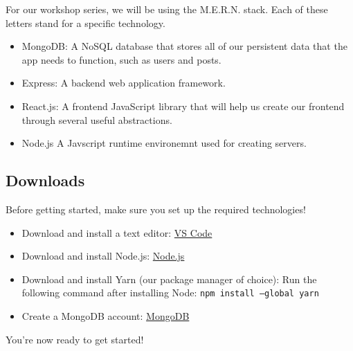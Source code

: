 For our workshop series, we will be using the M.E.R.N. stack. Each of these letters stand for a specific technology.
\begin{itemize}
    \item MongoDB: A NoSQL database that stores all of our persistent data that the app needs to function, such as users and posts. 
    \item Express: A backend web application framework. 
    \item React.js: A frontend JavaScript library that will help us create our frontend through several useful abstractions. 
    \item Node.js A Javscript runtime environemnt used for creating servers.
\end{itemize}

\subsection*{Downloads}

Before getting started, make sure you set up the required technologies!

\begin{itemize}
    \item Download and install a text editor: \href{https://code.visualstudio.com/download}{VS Code}
    \item Download and install Node.js: \href{https://nodejs.org/en/download/package-manager/}{Node.js}
    \item Download and install Yarn (our package manager of choice): Run the following command after installing Node: \texttt{npm install --global yarn}
    \item Create a MongoDB account: \href{https://www.mongodb.com/}{MongoDB}
\end{itemize}

You're now ready to get started!
